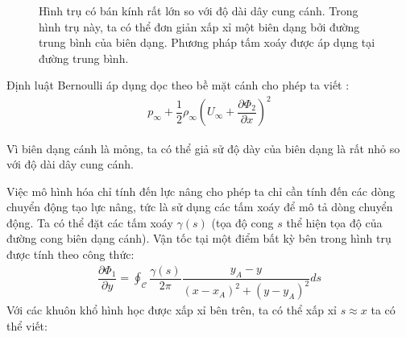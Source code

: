 \documentclass[KHI_DONG_HOC.tex]{subfiles}
\begin{document}
\begin{figure}[h!]
		\caption{Hình trụ có bán kính rất lớn so với độ dài dây cung cánh. Trong hình trụ này, ta có thể đơn giản xấp xỉ một biên dạng bởi đường trung bình của biên dạng. Phương pháp tấm xoáy được áp dụng tại đường trung bình.}
	\end{figure}
	
	
	
	Định luật Bernoulli áp dụng dọc theo bề mặt cánh cho phép ta viết :
	\begin{align}
		p_\infty + \dfrac{1}{2}\rho_\infty\left(U_\infty + \dfrac{\partial\Phi_2}{\partial x}\right)^2
	\end{align}

	Vì biên dạng cánh là mỏng, ta có thể giả sử độ dày của biên dạng là rất nhỏ so với độ dài dây cung cánh.

	Việc mô hình hóa chỉ tính đến lực nâng cho phép ta chỉ cần tính đến các dòng chuyển động tạo lực nâng, tức là sử dụng các tấm xoáy để mô tả dòng chuyển động. Ta có thể đặt các tấm xoáy $\gamma(s)$ (tọa độ cong $s$ thể hiện tọa độ của đường cong biên dạng cánh). Vận tốc tại một điểm bất kỳ bên trong hình trụ được tính theo công thức:
	\begin{align}
		\dfrac{\partial\Phi_1}{\partial y} = \oint_\mathcal{C} \dfrac{\gamma(s)}{2\pi}\dfrac{y_A-y}{(x-x_A)^2+(y-y_A)^2}ds
	\end{align}
	Với các khuôn khổ hình học được xấp xỉ bên trên, ta có thể xấp xỉ $s\approx x$ ta có thể viết:
	
\end{document}
